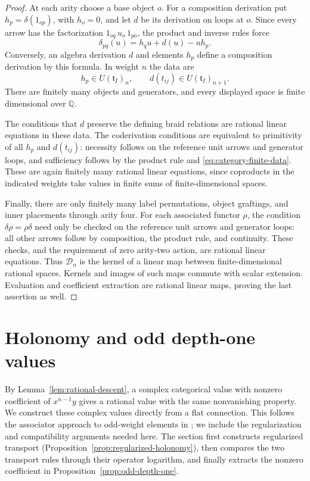 \documentclass[11pt]{article}
\theoremstyle{definition}
\theoremstyle{remark}
\numberwithin{equation}{section}
\begin{document}
\begin{proof}
At each arity choose a base object $o$.  For a composition derivation
put $h_p=\delta(1_{op})$, with $h_o=0$, and let $d$ be its derivation on
loops at $o$.  Since every arrow has the factorization
$1_{oq}\,u_o\,1_{po}$, the product and inverse rules force
\begin{equation}\label{eq:category-finite-data}
 \delta_{pq}(u)=h_qu+d(u)-uh_p.
\end{equation}
Conversely, an algebra derivation $d$ and elements $h_p$ define a
composition derivation by this formula.  In weight $n$ the data are
\[
 h_p\in U(\mathfrak t_I)_n,
 \qquad d(t_{ij})\in U(\mathfrak t_I)_{n+1}.
\]
There are finitely many objects and generators, and every displayed
space is finite dimensional over $\mathbb Q$.

The conditions that $d$ preserve the defining braid relations are
rational linear equations in these data.  The coderivation conditions
are equivalent to primitivity of all $h_p$ and $d(t_{ij})$: necessity
follows on the reference unit arrows and generator loops, and
sufficiency follows by the product rule and
\eqref{eq:category-finite-data}.  These are again finitely many rational
linear equations, since coproducts in the indicated weights take
values in finite sums of finite-dimensional spaces.

Finally, there are only finitely many label permutations, object
graftings, and inner placements through arity four.  For each associated
functor $\rho$, the condition $\delta\rho=\rho\delta$ need only be
checked on the reference unit arrows and generator loops: all other
arrows follow by composition, the product rule, and continuity.
These checks, and the requirement of zero arity-two action, are
rational linear equations.  Thus $\mathcal D_n$ is the kernel of a
linear map between finite-dimensional rational spaces.  Kernels and
images of such maps commute with scalar extension.  Evaluation and
coefficient extraction are rational linear maps, proving the last
assertion as well.
\end{proof}

\section{Holonomy and odd depth-one values}\label{sec:holonomy}

By Lemma~\ref{lem:rational-descent}, a complex categorical value with
nonzero coefficient of $x^{n-1}y$ gives a rational value with the same
nonvanishing property.  We construct these complex values directly
from a flat connection.
This follows the associator approach to odd-weight elements in
\cite[Proposition~6.3]{Drinfeld}; we include the regularization and
compatibility arguments needed here.  The section first constructs
regularized transport (Proposition~\ref{prop:regularized-holonomy}),
then compares the two transport rules through their operator logarithm,
and finally extracts the nonzero coefficient in
Proposition~\ref{prop:odd-depth-one}.
\end{document}
